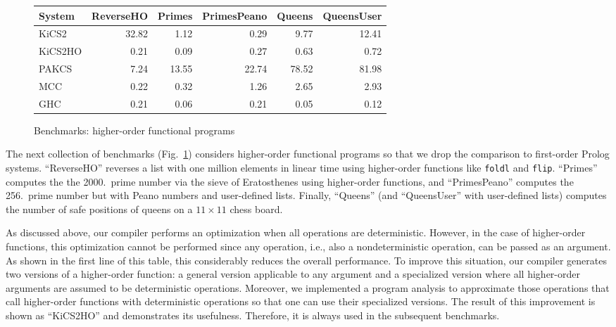 \documentclass{llncs}
\newcommand{\code}[1]{\mbox{\small\texttt{#1}}}
\begin{document}
\begin{figure}
\centering
\begin{tabular}{|@{~~}l@{~~}|*{5}{@{~~}r@{~~}|}}
\hline
System  & ReverseHO & Primes & PrimesPeano & Queens & QueensUser \\\hline
KiCS2   &     32.82 &   1.12 &        0.29 &   9.77 &     12.41  \\
KiCS2HO &      0.21 &   0.09 &        0.27 &   0.63 &      0.72  \\
PAKCS   &      7.24 &  13.55 &       22.74 &  78.52 &     81.98  \\
MCC     &      0.22 &   0.32 &        1.26 &   2.65 &      2.93  \\
GHC     &      0.21 &   0.06 &        0.21 &   0.05 &      0.12  \\
\hline
\end{tabular}
\caption{Benchmarks: higher-order functional programs}
 \label{fig:bench-higher-order}
\end{figure}
%
The next collection of benchmarks (Fig.~\ref{fig:bench-higher-order})
considers higher-order functional programs so that we drop
the comparison to first-order Prolog systems.
``ReverseHO'' reverses a list with one million
elements in linear time using higher-order functions
like \code{foldl} and \code{flip}.
``Primes'' computes the the 2000.\ prime number via the
sieve of Eratosthenes using higher-order functions,
and ``PrimesPeano'' computes the 256.\ prime number but
with Peano numbers and user-defined lists.
Finally, ``Queens'' (and ``QueensUser'' with user-defined lists)
computes the number of safe positions of queens on a $11 \times 11$
chess board.

As discussed above, our compiler performs an optimization
when all operations are deterministic. However, in the case
of higher-order functions, this optimization cannot be performed
since any operation, i.e., also a nondeterministic operation,
can be passed as an argument. As shown in the first line of this table,
this considerably reduces the overall performance.
To improve this situation, our compiler generates two versions
of a higher-order function: a general version applicable to any
argument and a specialized version where all higher-order arguments
are assumed to be deterministic operations.
Moreover, we implemented a program analysis
to approximate those operations that call higher-order functions
with deterministic operations so that one can use their
specialized versions. The result of this improvement
is shown as ``KiCS2HO'' and demonstrates its usefulness.
Therefore, it is always used in the subsequent benchmarks.
\end{document}
